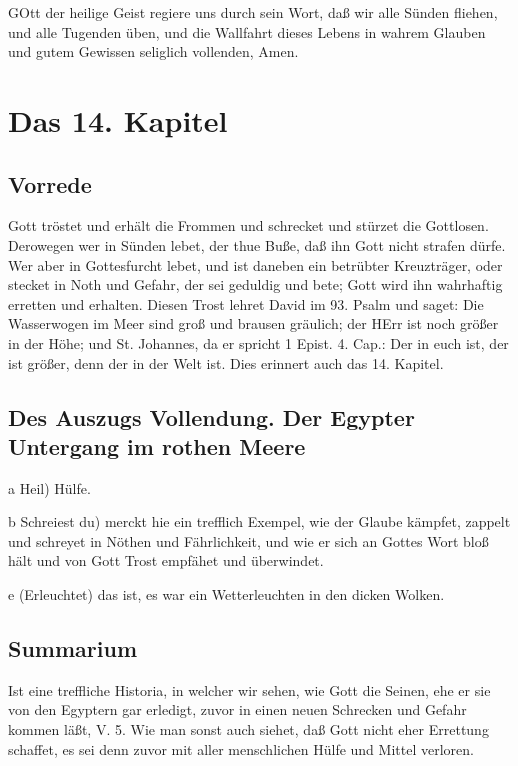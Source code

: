GOtt der heilige Geist regiere uns durch sein Wort, daß wir alle Sünden fliehen, und alle Tugenden üben, und die Wallfahrt dieses Lebens in wahrem Glauben und gutem Gewissen seliglich vollenden, Amen.

\chapter{Das 14. Kapitel}

\section{Vorrede}

Gott tröstet und erhält die Frommen und schrecket und stürzet die Gottlosen. Derowegen wer in Sünden lebet, der thue Buße, daß ihn Gott nicht strafen dürfe. Wer aber in Gottesfurcht lebet, und ist daneben ein betrübter Kreuzträger, oder stecket in Noth und Gefahr, der sei geduldig und bete; Gott wird ihn wahrhaftig erretten und erhalten. Diesen Trost lehret David im 93. Psalm und saget: Die Wasserwogen im Meer sind groß und brausen gräulich; der HErr ist noch größer in der Höhe; und St. Johannes, da er spricht 1 Epist. 4. Cap.: Der in euch ist, der ist größer, denn der in der Welt ist. Dies erinnert auch das 14. Kapitel.

\section[Des Auszugs Vollendung. Der Egypter Untergang im rothen]{Des Auszugs Vollendung. Der Egypter Untergang im rothen Meere}


a Heil) Hülfe.

b Schreiest du) merckt hie ein trefflich Exempel, wie der Glaube kämpfet, zappelt und schreyet in Nöthen und Fährlichkeit, und wie er sich an Gottes Wort bloß hält und von Gott Trost empfähet und überwindet.

e (Erleuchtet) das ist, es war ein Wetterleuchten in den dicken Wolken.


\section{Summarium}

Ist eine treffliche Historia, in welcher wir sehen, wie Gott die Seinen, ehe er sie von den Egyptern gar erledigt, zuvor in einen neuen Schrecken und Gefahr kommen läßt, V. 5. Wie man sonst auch siehet, daß Gott nicht eher Errettung schaffet, es sei denn zuvor mit aller menschlichen Hülfe und Mittel verloren.

